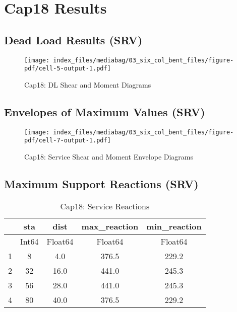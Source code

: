 \documentclass[
  letterpaper,
  DIV=11,
  numbers=noendperiod]{scrreprt}
\begin{document}
\section{Cap18 Results}\label{cap18-results-1}

\subsection{Dead Load Results (SRV)}\label{dead-load-results-srv-2}

\begin{figure}[H]

{\centering \texttt{[image: index\_files/mediabag/03\_six\_col\_bent\_files/figure-pdf/cell-5-output-1.pdf]}

}

\caption{Cap18: DL Shear and Moment Diagrams}

\end{figure}%

\subsection{Envelopes of Maximum Values
(SRV)}\label{envelopes-of-maximum-values-srv-3}

\begin{figure}[H]

{\centering \texttt{[image: index\_files/mediabag/03\_six\_col\_bent\_files/figure-pdf/cell-7-output-1.pdf]}

}

\caption{Cap18: Service Shear and Moment Envelope Diagrams}

\end{figure}%

\subsection{Maximum Support Reactions
(SRV)}\label{maximum-support-reactions-srv-3}

\begin{table}
\caption{Cap18: Service Reactions}\tabularnewline

\centering
\begin{tabular}{r|cccc}
    & sta & dist & max\_reaction & min\_reaction\\
    \hline
    & Int64 & Float64 & Float64 & Float64\\
    \hline
    1 & 8 & 4.0 & 376.5 & 229.2 \\
    2 & 32 & 16.0 & 441.0 & 245.3 \\
    3 & 56 & 28.0 & 441.0 & 245.3 \\
    4 & 80 & 40.0 & 376.5 & 229.2 \\
\end{tabular}
\end{table}
\end{document}
